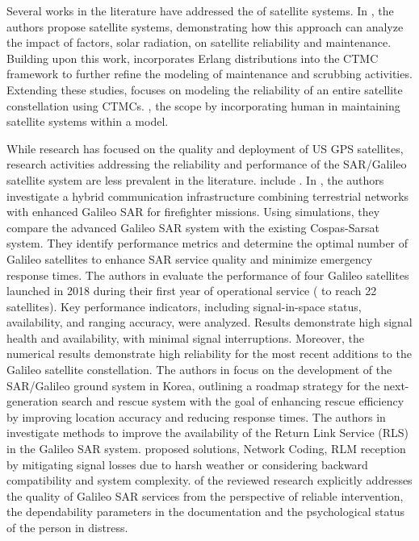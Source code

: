 Several works in the literature have addressed the  of satellite systems. In \cite{Zhaoguang2013}, the authors propose  satellite systems, demonstrating how this approach can analyze the impact of  factors,  solar radiation, on satellite reliability and maintenance. Building upon this work, \cite{Hoque2015} incorporates Erlang distributions into the CTMC framework to further refine the modeling of maintenance and scrubbing activities. Extending these studies, \cite{Zhaoguang2016} focuses on modeling the reliability of an entire satellite constellation using CTMCs. , \cite{Baouyaseaa2024}  the scope by incorporating human  in maintaining satellite systems within a  model.

While  research has focused on the quality and deployment of US GPS satellites, research activities  addressing the reliability and performance of the SAR/Galileo satellite system are less prevalent in the literature.  include \cite{Alegre2014,Inone2027,Lewandowski2008}. In \cite{Lewandowski2008}, the authors investigate a hybrid communication infrastructure combining terrestrial networks with enhanced Galileo SAR for firefighter missions. Using simulations, they compare the advanced Galileo SAR system with the existing Cospas-Sarsat system. They identify performance metrics and determine the optimal number of Galileo satellites to enhance SAR service quality and minimize emergency response times.  The authors in \cite{9115548} evaluate the performance of four Galileo satellites launched in 2018 during their first year of operational service ( to reach 22 satellites). Key performance indicators, including signal-in-space status, availability, and ranging accuracy, were analyzed. Results demonstrate high signal health and availability, with minimal signal interruptions. Moreover, the numerical results demonstrate high reliability for the most recent additions to the Galileo satellite constellation. The authors in \cite{Inone2027} focus on the development of the SAR/Galileo ground system in Korea, outlining a roadmap strategy for the next-generation search and rescue system with the goal of enhancing rescue efficiency by improving location accuracy and reducing response times. The authors in \cite{Alegre2014} investigate methods to improve the availability of the Return Link Service (RLS) in the Galileo SAR system.  proposed solutions,  Network Coding,  RLM reception by mitigating signal losses due to harsh weather or  considering backward compatibility and system complexity.  of the reviewed research explicitly addresses the quality of Galileo SAR services from the perspective of reliable intervention,  the dependability parameters  in the documentation and the psychological status of the person in distress.